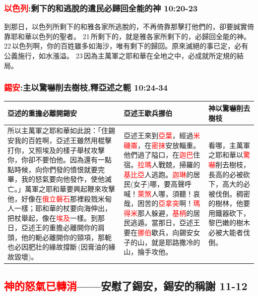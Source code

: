 \subsubsection{\textcolor{red}{以色列}:剩下的和逃脫的遺民必歸回全能的神 10:20-23}
到那日，以色列所剩下的和雅各家所逃脫的，不再倚靠那擊打他們的，卻要誠實倚靠耶和華以色列的聖者。 21 所剩下的，就是雅各家所剩下的，必歸回全能的神。 22 以色列啊，你的百姓雖多如海沙，唯有剩下的歸回。原來滅絕的事已定，必有公義施行，如水漲溢。 23 因為主萬軍之耶和華在全地之中，必成就所定規的結局。

\subsubsection{\textcolor{red}{錫安}:主以驚嚇削去樹枝,釋亞述之軛 10:24-34}
\begin{table}[H]
\centering 
\begin{tabular}{p{8.5cm}|p{5.75cm}|p{2.75cm}}\hline\hline
亞述的重擔必離開錫安&亞述王歇兵挪伯&神以驚嚇削去樹枝\\\hline
所以主萬軍之耶和華如此說：「住錫安我的百姓啊，亞述王雖然用棍擊打你，又照埃及的樣子舉杖攻擊你，你卻不要怕他。因為還有一點點時候，向你們發的憤恨就要完畢，我的怒氣要向他發作，使他滅亡。」萬軍之耶和華要興起鞭來攻擊他，好像在\textcolor{red}{俄立磐石}那裡殺戮米甸人一樣；耶和華的杖要向海伸出，把杖舉起，像在\textcolor{red}{埃及}一樣。到那日，亞述王的重擔必離開你的肩頭，他的軛必離開你的頸項，那軛也必因肥壯的緣故撐斷 (因膏油的緣故毀壞)。
&亞述王來到\textcolor{red}{亞葉}，經過\textcolor{red}{米磯崙}，在\textcolor{red}{密抹}安放輜重。他們過了隘口，在\textcolor{red}{迦巴}住宿。\textcolor{red}{拉瑪}人戰兢，掃羅的\textcolor{red}{基比亞}人逃跑。\textcolor{red}{迦琳}的居民(女子)哪，要高聲呼喊！\textcolor{red}{萊煞}人哪，須聽！哀哉，困苦的\textcolor{red}{亞拿突}啊！\textcolor{red}{瑪得米}那人躲避，\textcolor{red}{基柄}的居民逃遁。當那日，亞述王要在\textcolor{red}{挪伯}歇兵，向錫安女子的山，就是耶路撒冷的山，掄手攻他。
&看哪，主萬軍之耶和華以\textcolor{red}{驚嚇}削去樹枝，長高的必被砍下，高大的必被伐倒。稠密的樹林，他要用鐵器砍下，黎巴嫩的樹木必被大能者伐倒。\\\hline
\end{tabular}
\end{table}

\subsection{\textcolor{red}{神的怒氣已轉消}——安慰了錫安，錫安的稱謝 11-12}
